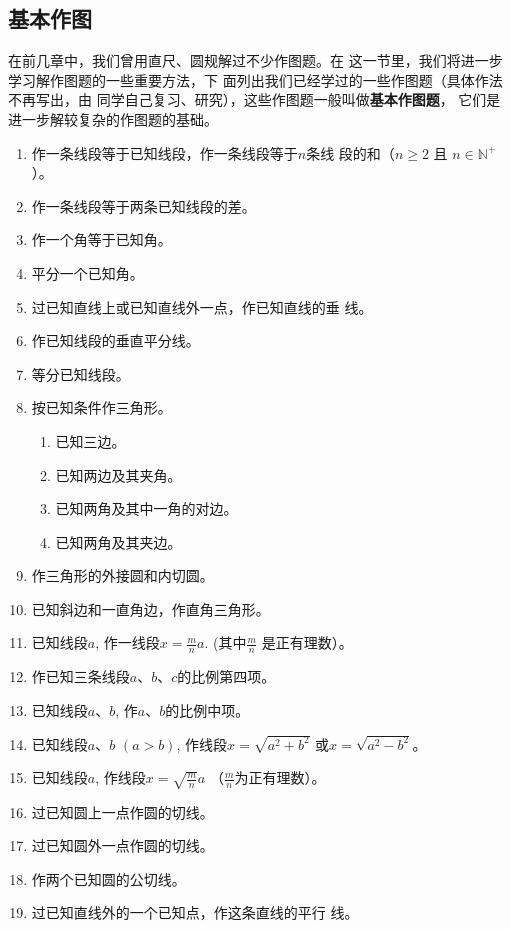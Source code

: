 \subsection{基本作图}
在前几章中，我们曾用直尺、圆规解过不少作图题。在
这一节里，我们将进一步学习解作图题的一些重要方法，下
面列出我们已经学过的一些作图题（具体作法不再写出，由
同学自己复习、研究），这些作图题一般叫做\textbf{基本作图题}，
它们是进一步解较复杂的作图题的基础。
\begin{enumerate}
\item 作一条线段等于已知线段，作一条线段等于$n$条线
段的和（$n\ge 2$ 且 $n\in\mathbb{N}^+$）。
\item 作一条线段等于两条已知线段的差。
\item 作一个角等于已知角。
\item 平分一个已知角。
\item 过已知直线上或已知直线外一点，作已知直线的垂
线。
\item 作已知线段的垂直平分线。
\item 等分已知线段。
\item 按已知条件作三角形。
\begin{enumerate}
 \item 已知三边。
\item 已知两边及其夹角。
\item 已知两角及其中一角的对边。
\item 已知两角及其夹边。 
\end{enumerate}
\item 作三角形的外接圆和内切圆。
\item 已知斜边和一直角边，作直角三角形。
\item 已知线段$a$, 作一线段$x=\frac{m}{n}a$. (其中$\frac{m}{n}$
是正有理数）。
\item 作已知三条线段$a$、$b$、$c$的比例第四项。
\item 已知线段$a$、$b$, 作$a$、$b$的比例中项。
\item 已知线段$a$、$b$ $(a>b)$, 作线段$x=\sqrt{a^2+b^2}$
或$x=\sqrt{a^2-b^2}$。
\item 已知线段$a$, 作线段$x=\sqrt{\frac{m}{n}}a$ （$\frac{m}{n}$为正有理数）。
\item 过已知圆上一点作圆的切线。
\item 过已知圆外一点作圆的切线。
\item 作两个已知圆的公切线。
\item 过已知直线外的一个已知点，作这条直线的平行
线。
\end{enumerate}

